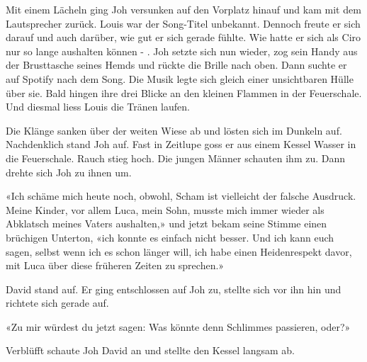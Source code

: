 Mit einem Lächeln ging Joh versunken auf den Vorplatz hinauf und kam mit
dem Lautsprecher zurück. Louis war der Song-Titel unbekannt. Dennoch
freute er sich darauf und auch darüber, wie gut er sich gerade fühlte. Wie hatte er sich als Ciro nur so lange aushalten können - .
Joh setzte sich nun wieder, zog sein Handy aus der Brusttasche seines Hemds
und rückte die Brille nach oben. Dann suchte er auf Spotify nach dem
Song.
Die Musik legte sich gleich einer unsichtbaren Hülle über sie. Bald
hingen ihre drei Blicke an den kleinen Flammen in der Feuerschale. Und
diesmal liess Louis die Tränen laufen. 


Die Klänge sanken über der weiten Wiese ab und lösten sich im Dunkeln auf.
Nachdenklich stand Joh auf. Fast in Zeitlupe goss er aus einem Kessel
Wasser in die Feuerschale. Rauch stieg hoch. Die jungen Männer schauten
ihm zu. 
Dann drehte sich Joh zu ihnen um.

«Ich schäme mich heute noch, obwohl, Scham ist vielleicht der falsche
Ausdruck. Meine Kinder, vor allem Luca, mein Sohn, musste mich immer
wieder als Abklatsch meines Vaters aushalten,» und jetzt bekam seine 
Stimme einen brüchigen Unterton, «ich konnte es einfach nicht besser. Und ich
kann euch sagen, selbst wenn ich es schon länger will, ich habe einen
Heidenrespekt davor, mit Luca über diese früheren Zeiten zu sprechen.»

David stand auf. Er ging entschlossen auf Joh zu, stellte sich vor ihn hin 
und richtete sich gerade auf.

«Zu mir würdest du jetzt sagen: Was könnte denn Schlimmes passieren,
oder?»

Verblüfft schaute Joh David an und stellte den Kessel langsam ab. 